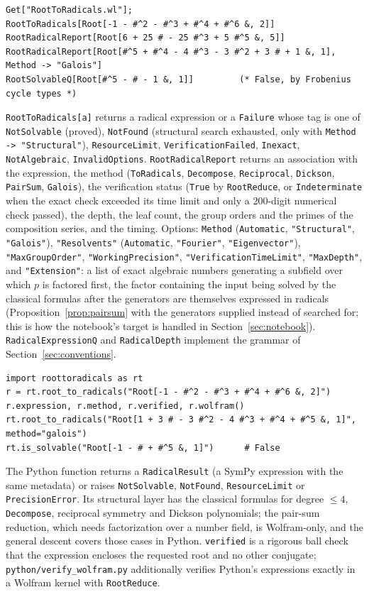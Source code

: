 \documentclass[11pt,a4paper]{article}
\theoremstyle{definition}
\theoremstyle{remark}
\newcommand{\code}[1]{\texttt{#1}}
\begin{document}
\begin{lstlisting}
Get["RootToRadicals.wl"];
RootToRadicals[Root[-1 - #^2 - #^3 + #^4 + #^6 &, 2]]
RootRadicalReport[Root[6 + 25 # - 25 #^3 + 5 #^5 &, 5]]
RootRadicalReport[Root[#^5 + #^4 - 4 #^3 - 3 #^2 + 3 # + 1 &, 1], Method -> "Galois"]
RootSolvableQ[Root[#^5 - # - 1 &, 1]]         (* False, by Frobenius cycle types *)
\end{lstlisting}
\begin{sloppypar}
\code{RootToRadicals[a]} returns a radical expression or a \code{Failure} whose tag is one
of \code{NotSolvable} (proved), \code{NotFound} (structural search exhausted, only with
\code{Method -> "Structural"}), \code{ResourceLimit}, \code{VerificationFailed},
\code{Inexact}, \code{NotAlgebraic}, \code{InvalidOptions}.  \code{RootRadicalReport}
returns an association with the expression, the method (\code{ToRadicals},
\code{Decompose}, \code{Reciprocal}, \code{Dickson}, \code{PairSum}, \code{Galois}), the
verification status (\code{True} by \code{RootReduce}, or \code{Indeterminate} when the
exact check exceeded its time limit and only a 200-digit numerical check passed), the
depth, the leaf count, the group orders and the primes of the composition series, and
the timing.  Options: \code{Method} (\code{Automatic}, \code{"Structural"},
\code{"Galois"}), \code{"Resolvents"} (\code{Automatic}, \code{"Fourier"},
\code{"Eigenvector"}), \code{"MaxGroupOrder"}, \code{"WorkingPrecision"},
\code{"VerificationTimeLimit"}, \code{"MaxDepth"}, and \code{"Extension"}: a list of
exact algebraic numbers generating a subfield over which $p$ is factored first, the
factor containing the input being solved by the classical formulas after the generators
are themselves expressed in radicals (Proposition~\ref{prop:pairsum} with the generators
supplied instead of searched for; this is how the notebook's target is handled in
Section~\ref{sec:notebook}).  \code{RadicalExpressionQ} and \code{RadicalDepth}
implement the grammar of Section~\ref{sec:conventions}.
\end{sloppypar}

\begin{lstlisting}
import roottoradicals as rt
r = rt.root_to_radicals("Root[-1 - #^2 - #^3 + #^4 + #^6 &, 2]")
r.expression, r.method, r.verified, r.wolfram()
rt.root_to_radicals("Root[1 + 3 # - 3 #^2 - 4 #^3 + #^4 + #^5 &, 1]", method="galois")
rt.is_solvable("Root[-1 - # + #^5 &, 1]")      # False
\end{lstlisting}
The Python function returns a \code{RadicalResult} (a SymPy expression with the same
metadata) or raises \code{NotSolvable}, \code{NotFound}, \code{ResourceLimit} or
\code{PrecisionError}.  Its structural layer has the classical formulas for degree
$\le4$, \code{Decompose}, reciprocal symmetry and Dickson polynomials; the pair-sum
reduction, which needs factorization over a number field, is Wolfram-only, and the
general descent covers those cases in Python.  \code{verified} is a rigorous ball check
that the expression encloses the requested root and no other conjugate;
\code{python/verify\_wolfram.py} additionally verifies Python's expressions exactly in a
Wolfram kernel with \code{RootReduce}.
\end{document}
